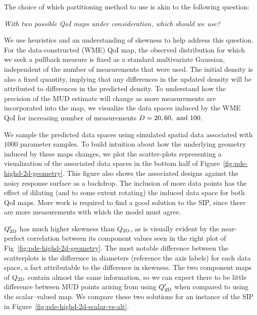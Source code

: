 The choice of which partitioning method to use is akin to the following question:
\begin{center}
\emph{With two possible QoI maps under consideration, which should we use?}
\end{center}

We use heuristics and an understanding of skewness to help address this question.
For the data-constructed (WME) QoI map, the observed distribution for which we seek a pullback measure is fixed as a standard multivariate Gaussian, independent of the number of measurements that were used.
The initial density is also a fixed quantity, implying that any differences in the updated density will be attributed to differences in the predicted density.
To understand how the precision of the MUD estimate will change as more measurements are incorporated into the map, we visualize the data spaces induced by the WME QoI for increasing number of measurements $D = 20, 60, \text{ and } 100$.

We sample the predicted data spaces using simulated spatial data associated with $1000$ parameter samples.
To build intuition about how the underlying geometry induced by these maps changes, we plot the scatter-plots representing a visualization of the associated data spaces in the bottom half of Figure~\ref{fig:pde-highd-2d-geometry}.
This figure also shows the associated designs against the noisy response surface as a backdrop.
The inclusion of more data points has the effect of dilating (and to some extent rotating) the induced data space for both QoI maps.
More work is required to find a good solution to the SIP, since there are more measurements with which the model must agree.

$Q_\text{2D}^\prime$ has much higher skewness than $Q_\text{2D}$, as is visually evident by the near-perfect correlation between its component values seen in the right plot of Fig~\ref{fig:pde-highd-2d-geometry}.
The most notable difference between the scatterplots is the difference in diameters (reference the axis labels) for each data space, a fact attributable to the difference in skewness.
The two component maps of $Q_\text{2D}$ contain almost the same information, so we can expect there to be little difference between MUD points arising from using $Q_\text{2D}^\prime$ when compared to using the scalar--valued map.
We compare these two solutions for an instance of the SIP in Figure~\ref{fig:pde-highd-2d-scalar-vs-alt}.


